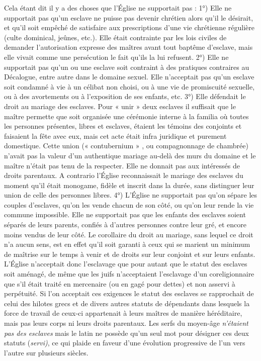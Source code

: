  Cela étant dit il y a des choses que l'Église ne supportait pas : 1°) Elle ne supportait pas qu'un esclave ne puisse pas devenir chrétien alors qu'il le désirait, et qu'il soit empêché de satisfaire aux prescriptions d'une vie chrétienne régulière (culte dominical, jeûnes, etc.). Elle était contrainte par les lois civiles de demander l'autorisation expresse des maîtres avant tout baptême d'esclave, mais elle vivait comme une persécution le fait qu'ils la lui refusent. 2°) Elle ne supportait pas qu'un ou une esclave soit contraint à des pratiques contraires au Décalogue, entre autre dans le domaine sexuel. Elle n'acceptait pas qu'un esclave soit condamné à vie à un célibat non choisi, ou à une vie de promiscuité sexuelle, ou à des avortements ou à l'exposition de ses enfants, etc. 3°) Elle défendait le droit au mariage des esclaves. Pour « unir » deux esclaves il suffisait que le maître permette que soit organisée une cérémonie interne à la familia où toutes les personnes présentes, libres et esclaves, étaient les témoins des conjoints et faisaient la fête avec eux, mais cet acte était infra juridique et purement domestique. Cette union (« contubernium » , ou compagnonnage de chambrée) n'avait pas la valeur d'un authentique mariage au-delà des murs du domaine et le maître n'était pas tenu de la respecter. Elle ne donnait pas aux intéressés de droits parentaux. A contrario l'Église reconnaissait le mariage des esclaves du moment qu'il était monogame, fidèle et inscrit dans la durée, sans distinguer leur union de celle des personnes libres. 4°) L'Église ne supportait pas qu'on sépare les couples d'esclaves, qu'on les vende chacun de son côté, ou qu'on leur rende la vie commune impossible. Elle ne supportait pas que les enfants des esclaves soient séparés de leurs parents, confiés à d'autres personnes contre leur gré, et encore moins vendus de leur côté. Le corollaire du droit au mariage, sans lequel ce droit n'a aucun sens, est en effet qu'il soit garanti à ceux qui se marient un minimum de maîtrise sur le temps à venir et de droits sur leur conjoint et sur leurs enfants. 
 L'Église n'acceptait donc l'esclavage que pour autant que le statut des esclaves soit aménagé, de même que les juifs n'acceptaient l'esclavage d'un coreligionnaire que s'il était traité en mercenaire (ou en gagé pour dettes) et non asservi à perpétuité. Si l'on acceptait ces exigences le statut des esclaves se rapprochait de celui des hilotes grecs et de divers autres statuts de dépendants dans lesquels la force de travail de ceux-ci appartenait à leurs maîtres de manière héréditaire, mais pas leurs corps ni leurs droits parentaux. Les serfs du moyen-âge\emph{ n'étaient pas des esclaves} mais le latin ne possède qu'un seul mot pour désigner ces deux statuts (\emph{servi)}, ce qui plaide en faveur d'une évolution progressive de l'un vers l'autre sur plusieurs siècles.
